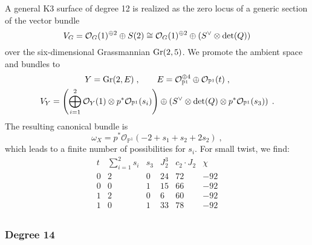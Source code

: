 \documentclass[11pt,a4paper]{article}
\numberwithin{equation}{section}
\numberwithin{table}{section}\setlength{\multlinegap}{25pt}
\begin{document}
A general K3 surface of degree 12 is realized as the zero locus of a generic section of the vector bundle~\cite{Mukai5}
\begin{equation}
    \label{eq:Degree12FiberDefiningBundle}
    V_G=\mathcal{O}_G(1)^{\oplus 2}\oplus S(2)\cong \mathcal{O}_G(1)^{\oplus 2}\oplus \left(S^\vee \otimes \textup{det}(Q)\right)
\end{equation}
over the six-dimensional Grassmannian $\textup{Gr}(2,5)$. We promote the ambient space and bundles to
\begin{equation}
    \begin{gathered}
    Y = \textup{Gr}(2,E)\;,\qquad E = \mathcal{O}_{\mathbb{P}^1}^{\oplus 4}\oplus \mathcal{O}_{\mathbb{P}^1}(t)\;,\\
    V_Y=\left(\bigoplus_{i=1}^2\mathcal{O}_Y(1)\otimes p^*\mathcal{O}_{\mathbb{P}^1}(s_i)\right)\oplus \left(S^\vee \otimes \textup{det}(Q)\otimes p^*\mathcal{O}_{\mathbb{P}^1}(s_3)\right)\;.
    \end{gathered}
\end{equation}
The resulting canonical bundle is
\begin{equation}
    \omega_X=p^*\mathcal{O}_{\mathbb{P}^1}(-2+s_1+s_2+2s_2)\;,
\end{equation}
which leads to a finite number of possibilities for $s_i$. For small twist, we find:
\begin{equation}
    \begin{array}{cccccc}
        t & \textstyle{\sum_{i=1}^2}s_i & s_3 & J_2^3 & c_2\cdot J_2 & \chi\\
        \hline
        0 & 2 & 0 & 24 & 72 & -92\\
        0 & 0 & 1 & 15 & 66 & -92\\
        1 & 2 & 0 &  6 & 60 & -92\\
        1 & 0 & 1 & 33 & 78 & -92\\
    \end{array}
\end{equation}

\subsubsection*{Degree 14}
\end{document}
